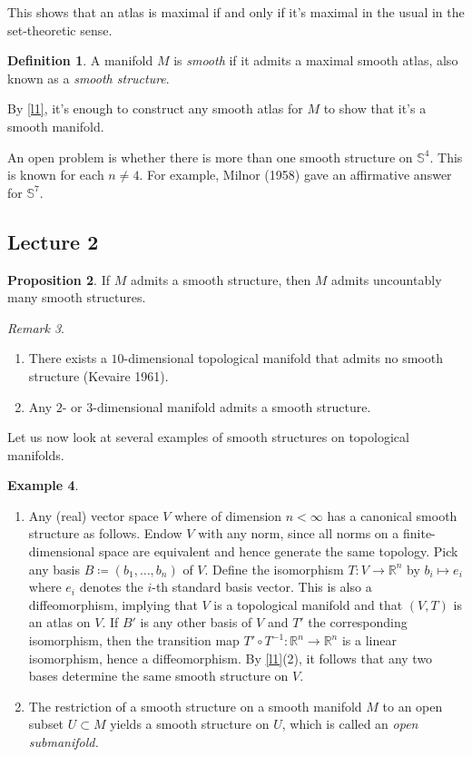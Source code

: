 \documentclass[10pt,letterpaper,cm]{nupset}
\theoremstyle{definition}
\newtheorem{definition}{Definition}[subsection]
\newtheorem{exmp}[definition]{Example}
\theoremstyle{theorem}
\newtheorem{prop}[definition]{Proposition}
\theoremstyle{remark}
\newtheorem{remark}[definition]{Remark}
\newcommand{\R}{\mathbb R}
\renewcommand{\S}{\mathbb S}
\newcommand{\1}{\mathbf{1}}
\newcommand{\0}{\vec 0}
\begin{document}
This shows that an atlas is maximal  if and only if it's maximal in the usual in the set-theoretic sense.

\theoremstyle{definition}
\begin{definition}{A manifold $M$ is \textit{smooth} if it admits a maximal smooth atlas, also known as a \textit{smooth structure}.}
\end{definition}

By \cref{l1}, it's enough to construct any smooth atlas for $M$ to show that it's a smooth manifold.

\medskip

An open problem is whether there is more than one smooth structure on $\S^4$. This is known for each $n \ne 4$. For example, Milnor (1958) gave an affirmative answer for $\S^7$.

\subsection{Lecture 2}


\begin{prop}
{If $M$ admits a smooth structure, then $M$ admits uncountably many smooth structures.} 
\end{prop}


\begin{remark} $ $
\begin{enumerate}
\item There exists a $10$-dimensional topological manifold that admits no smooth structure (Kevaire 1961).
\item Any $2$- or $3$-dimensional manifold admits a smooth structure.
\end{enumerate}
\end{remark}

\smallskip

Let us now look at several examples of smooth structures on topological manifolds.

\begin{exmp}\label{E1} $ $
\begin{enumerate}[label=(\arabic*)]
\item Any (real) vector space $V$ where of dimension  $n<\infty$ has a canonical smooth structure as follows. Endow $V$ with any norm, since all norms on a finite-dimensional space are equivalent and hence generate the same topology. Pick any basis $B\coloneqq  (b_1, \ldots, b_n)$ of $V$.  Define the isomorphism  $T: V \to \R^n$ by $b_i \mapsto e_i$ where $e_i$ denotes the $i$-th standard basis vector. This is also a diffeomorphism, implying that $V$ is a topological manifold and that $\left(V, T\right)$ is an atlas on $V$. If $B'$ is any other basis of $V$ and $T'$ the corresponding isomorphism, then the transition map $T' \circ T^{-1}: \R^n \to \R^n$ is a linear isomorphism, hence a diffeomorphism. By \cref{l1}(2), it follows that any two bases determine the same smooth structure on $V$. 
\item The restriction of a smooth structure on  a smooth manifold $M$ to an open subset $U \subset M$ yields a smooth structure on $U$, which is called an \textit{open submanifold.} 
\end{enumerate}
\end{exmp}
\end{document}
